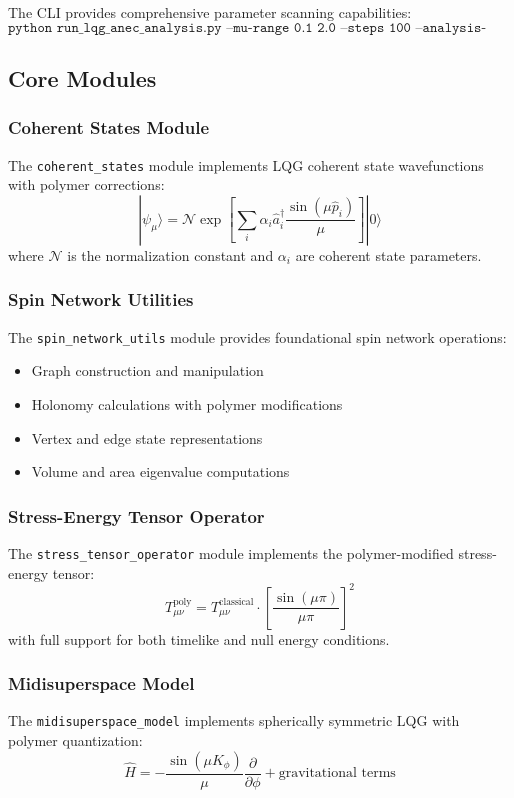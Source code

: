 \documentclass[11pt]{article}
\begin{document}
The CLI provides comprehensive parameter scanning capabilities:
\[
\texttt{python run\_lqg\_anec\_analysis.py --mu-range 0.1 2.0 --steps 100 --analysis-type full}
\]

\subsection{Core Modules}

\subsubsection{Coherent States Module}
The \texttt{coherent\_states} module implements LQG coherent state wavefunctions with polymer corrections:
\[
|\psi_{\mu}\rangle = \mathcal{N} \exp\left[\sum_{i} \alpha_i \hat{a}_i^{\dagger} \frac{\sin(\mu \hat{p}_i)}{\mu}\right] |0\rangle
\]
where $\mathcal{N}$ is the normalization constant and $\alpha_i$ are coherent state parameters.

\subsubsection{Spin Network Utilities}
The \texttt{spin\_network\_utils} module provides foundational spin network operations:
\begin{itemize}
\item Graph construction and manipulation
\item Holonomy calculations with polymer modifications
\item Vertex and edge state representations
\item Volume and area eigenvalue computations
\end{itemize}

\subsubsection{Stress-Energy Tensor Operator}
The \texttt{stress\_tensor\_operator} module implements the polymer-modified stress-energy tensor:
\[
T_{\mu\nu}^{\text{poly}} = T_{\mu\nu}^{\text{classical}} \cdot \left[\frac{\sin(\mu \pi)}{\mu \pi}\right]^2
\]
with full support for both timelike and null energy conditions.

\subsubsection{Midisuperspace Model}
The \texttt{midisuperspace\_model} implements spherically symmetric LQG with polymer quantization:
\[
\hat{H} = -\frac{\sin(\mu K_\phi)}{\mu} \frac{\partial}{\partial \phi} + \text{gravitational terms}
\]
\end{document}
